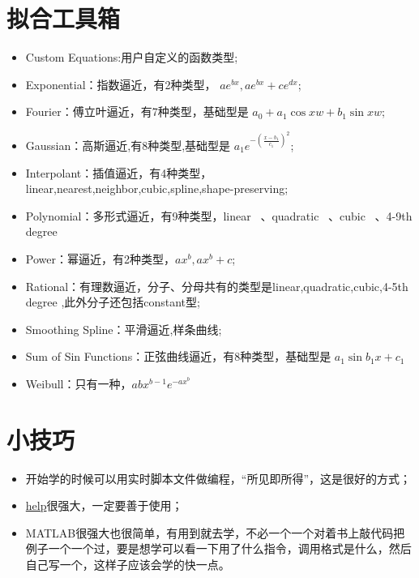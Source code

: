 \documentclass{hfutpaper}
\begin{document}
\section*{拟合工具箱}
\begin{itemize}
\item Custom Equations:用户自定义的函数类型;
\item Exponential：指数逼近，有2种类型， $ae^{bx},ae^{bx}+ce^{dx}$;
\item Fourier：傅立叶逼近，有7种类型，基础型是 $a_0+a_1\cos {xw}+b_1\sin {xw}$;
\item Gaussian：高斯逼近,有8种类型,基础型是 $a_1e^{-(\frac{x-b_1}{c_1})^2}$;
\item Interpolant：插值逼近，有4种类型，linear,nearest,neighbor,cubic,spline,shape-preserving;
\item Polynomial：多形式逼近，有9种类型，linear ~、quadratic ~、cubic ~、4-9th degree ~
\item Power：幂逼近，有2种类型，$ax^b ,ax^b + c$;
\item Rational：有理数逼近，分子、分母共有的类型是linear,quadratic,cubic,4-5th degree ,此外分子还包括constant型;
\item Smoothing Spline：平滑逼近,样条曲线;
\item Sum of Sin Functions：正弦曲线逼近，有8种类型，基础型是 $a_1\sin{b_1x + c_1}$
\item Weibull：只有一种，$abx^{b-1}e^{-ax^b}$
\end{itemize}

\section{小技巧}
\begin{itemize}
	\item 开始学的时候可以用实时脚本文件做编程，“所见即所得”，这是很好的方式；
	\item \underline{help}很强大，一定要善于使用；
	\item MATLAB很强大也很简单，有用到就去学，不必一个一个对着书上敲代码把例子一个一个过，要是想学可以看一下用了什么指令，调用格式是什么，然后自己写一个，这样子应该会学的快一点。
\end{itemize}
\end{document}
